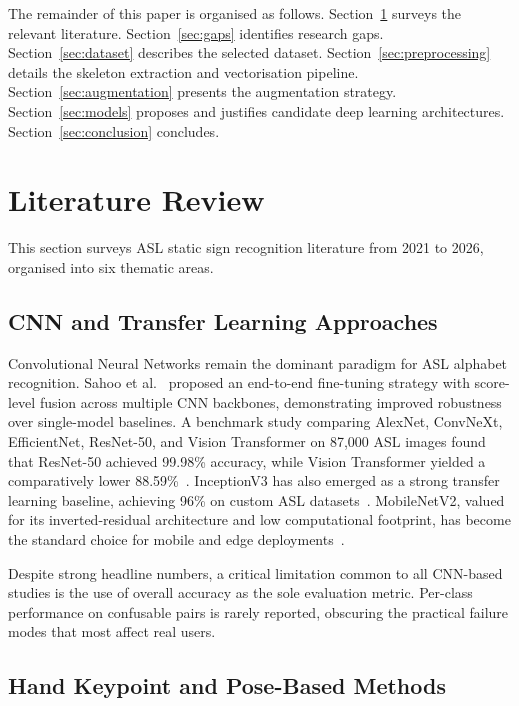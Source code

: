 \documentclass[conference]{IEEEtran}
\begin{document}
The remainder of this paper is organised as follows. Section~\ref{sec:review}
surveys the relevant literature. Section~\ref{sec:gaps} identifies research
gaps. Section~\ref{sec:dataset} describes the selected dataset.
Section~\ref{sec:preprocessing} details the skeleton extraction and
vectorisation pipeline. Section~\ref{sec:augmentation} presents the augmentation
strategy. Section~\ref{sec:models} proposes and justifies candidate deep learning
architectures. Section~\ref{sec:conclusion} concludes.

\section{Literature Review}
\label{sec:review}

This section surveys ASL static sign recognition literature from 2021 to 2026,
organised into six thematic areas.

\subsection{CNN and Transfer Learning Approaches}

Convolutional Neural Networks remain the dominant paradigm for ASL alphabet
recognition. Sahoo et al.~\cite{sahoo2023} proposed an end-to-end fine-tuning
strategy with score-level fusion across multiple CNN backbones, demonstrating
improved robustness over single-model baselines. A benchmark study comparing
AlexNet, ConvNeXt, EfficientNet, ResNet-50, and Vision Transformer on 87,000
ASL images found that ResNet-50 achieved 99.98\% accuracy, while Vision
Transformer yielded a comparatively lower 88.59\%~\cite{taskiran2023}. InceptionV3
has also emerged as a strong transfer learning baseline, achieving 96\% on custom
ASL datasets~\cite{transfer2023}. MobileNetV2, valued for its inverted-residual
architecture and low computational footprint, has become the standard choice for
mobile and edge deployments~\cite{alam2024}.

Despite strong headline numbers, a critical limitation common to all CNN-based
studies is the use of overall accuracy as the sole evaluation metric. Per-class
performance on confusable pairs is rarely reported, obscuring the practical
failure modes that most affect real users.

\subsection{Hand Keypoint and Pose-Based Methods}
\end{document}
